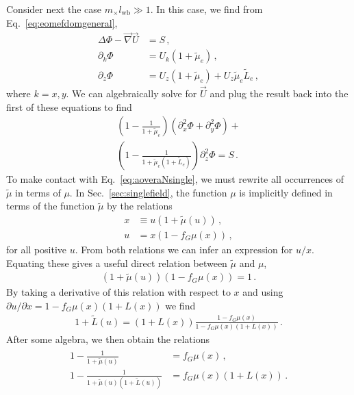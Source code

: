 \documentclass[reprint, amsmath,amssymb, nofootinbib, aps, prd]{revtex4-2}
\begin{document}
Consider next the case $m_\times l_{\mathrm{wb}} \gg 1$.
In this case, we find from Eq.~\eqref{eq:eomefdomgeneral},
\begin{subequations}
\begin{align}
\Delta \Phi - \vec{\nabla} \vec{U} &= S \,, \\
\partial_k \Phi &= U_k (1 + \tilde{\mu}_e) \,, \\
\partial_z \Phi &= U_z (1 + \tilde{\mu}_e) + U_z \tilde{\mu}_e \tilde{L}_e \,,
\end{align}
\end{subequations}
where $k = x,y$.
We can algebraically solve for $\vec{U}$ and plug the result back into the first of these equations to find
\begin{multline}
\left(1 - \frac{1}{1 + \tilde{\mu}_e}\right) (\partial_x^2 \Phi + \partial_y^2 \Phi) + \\
  \left(1 - \frac{1}{1 + \tilde{\mu}_e(1 + \tilde{L}_e)}\right) \partial_z^2 \Phi = S \,.
\end{multline}
To make contact with Eq.~\eqref{eq:aoveraNsingle}, we must rewrite all occurrences of $\tilde{\mu}$ in terms of $\mu$.
In Sec.~\ref{sec:singlefield}, the function $\mu$ is implicitly defined in terms of the function $\tilde{\mu}$ by the relations
\begin{subequations}
\begin{align}
 x &\equiv u \left( 1 + \tilde{\mu}(u) \right) \,, \\
 u &= x \left(1 - f_G \mu(x) \right) \,,
\end{align}
\end{subequations}
for all positive $u$.
From both relations we can infer an expression for $u/x$.
Equating these gives a useful direct relation between $\tilde{\mu}$ and $\mu$,
\begin{align}
 (1 + \tilde{\mu}(u))(1  - f_G \mu(x)) = 1 \,.
\end{align}
By taking a derivative of this relation with respect to $x$ and using $\partial u / \partial x = 1 - f_G \mu(x) (1 + L(x))$ we find
\begin{align}
 1 + \tilde{L}(u) = (1 + L(x)) \frac{1 - f_G \mu(x)}{1 - f_G \mu(x) (1 + L(x))} \,.
\end{align}
After some algebra, we then obtain the relations
\begin{align}
\begin{split}
 1 - \frac{1}{1 + \tilde{\mu}(u)} &= f_G \mu(x) \,, \\
 1 - \frac{1}{1 + \tilde{\mu}(u)(1 + \tilde{L}(u))} &= f_G \mu(x) (1 + L(x)) \,.
\end{split}
\end{align}
\end{document}
